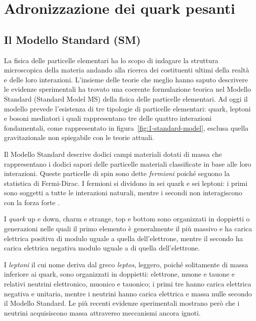 \chapter{Adronizzazione dei quark pesanti}

\section{Il Modello Standard (SM)}
\label{SM}
    La fisica delle particelle elementari ha lo scopo di indagare la struttura microscopica della materia andando alla ricerca dei costituenti ultimi della realtà e delle loro interazioni. L'insieme delle teorie che meglio hanno saputo descrivere le evidenze sperimentali ha trovato una coerente formulazione teorica nel Modello Standard (Standard Model MS) della fisica delle particelle elementari. Ad oggi il modello prevede l'esistenza di tre tipologie di particelle elementari: quark, leptoni e bosoni mediatori i quali rappresentano tre delle quattro interazioni fondamentali, come rappresentato in figura~\ref{fig:1-standard-model}, esclusa quella gravitazionale non spiegabile con le teorie attuali.
    
    Il Modello Standard descrive dodici campi materiali dotati di massa che rappresentano i dodici sapori delle particelle materiali classificate in base alle loro interazioni. Queste particelle di spin  sono dette \textit{fermioni} poiché seguono la statistica di Fermi-Dirac. I fermioni si dividono in sei quark e sei leptoni: i primi sono soggetti a tutte le interazioni naturali, mentre i secondi non interagiscono con la forza forte \cite{cottingham_introduction_2007}.
    
    I \textit{quark} up e down, charm e strange, top e bottom sono organizzati in doppietti o generazioni nelle quali il primo elemento è generalmente il più massivo e ha carica elettrica positiva di modulo uguale a  quella dell'elettrone, mentre il secondo ha carica elettrica negativa modulo uguale a  di quella dell'elettrone.

    I \textit{leptoni} il cui nome deriva dal greco \textit{leptos}, leggero, poiché solitamente di massa inferiore ai quark, sono organizzati in doppietti: elettrone, muone e tauone e relativi neutrini elettronico, muonico e tauonico; i primi tre hanno carica elettrica negativa e unitaria, mentre i neutrini hanno carica elettrica e massa nulle secondo il Modello Standard. Le più recenti evidenze sperimentali mostrano però che i neutrini acquisiscono massa attraverso meccanismi ancora ignoti.

